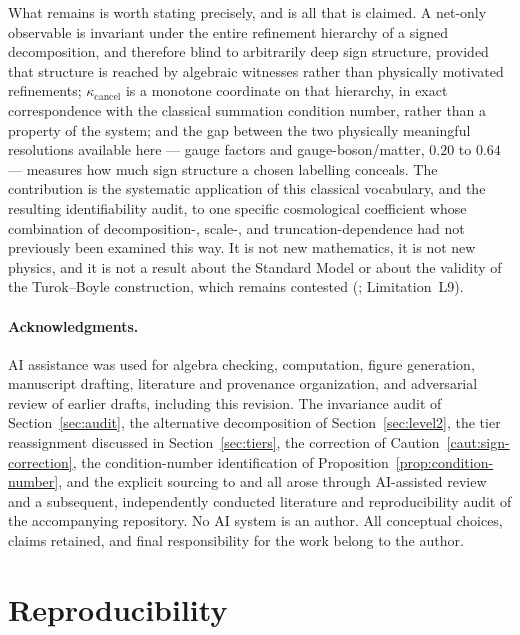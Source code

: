 \documentclass[11pt]{article}
\theoremstyle{definition}
\theoremstyle{remark}
\newcommand{\kcancel}{\kappa_{\mathrm{cancel}}}
\begin{document}
What remains is worth stating precisely, and is all that is claimed. A net-only observable is
invariant under the entire refinement hierarchy of a signed decomposition, and therefore blind to
arbitrarily deep sign structure, provided that structure is reached by algebraic witnesses rather
than physically motivated refinements; $\kcancel$ is a monotone coordinate on that hierarchy, in
exact correspondence with the classical summation condition number, rather than a property of the
system; and the gap between the two physically meaningful resolutions available here --- gauge
factors and gauge-boson/matter, $0.20$ to $0.64$ --- measures how much sign structure a chosen
labelling conceals. The contribution is the systematic application of this classical vocabulary,
and the resulting identifiability audit, to one specific cosmological coefficient whose combination
of decomposition-, scale-, and truncation-dependence had not previously been examined this way. It
is not new mathematics, it is not new physics, and it is not a result about the Standard Model or
about the validity of the Turok--Boyle construction, which remains contested
(\citealp{ClineHell2026}; Limitation~L9).

\paragraph{Acknowledgments.} AI assistance was used for algebra checking, computation, figure
generation, manuscript drafting, literature and provenance organization, and adversarial review of
earlier drafts, including this revision. The invariance audit of Section~\ref{sec:audit}, the
alternative decomposition of Section~\ref{sec:level2}, the tier reassignment discussed in
Section~\ref{sec:tiers}, the correction of Caution~\ref{caut:sign-correction}, the condition-number
identification of Proposition~\ref{prop:condition-number}, and the explicit sourcing to
\citet{ArnoldZhai1995} and \citet{Buttazzo2013} all arose through AI-assisted review and a
subsequent, independently conducted literature and reproducibility audit of the accompanying
repository. No AI system is an author. All conceptual choices, claims retained, and final
responsibility for the work belong to the author.

\appendix
\section{Reproducibility}
\label{sec:reproducibility}
\end{document}
